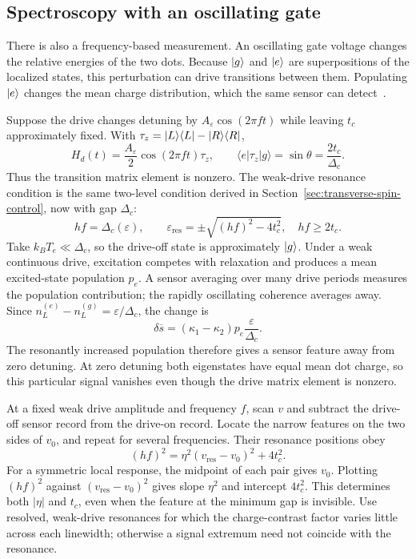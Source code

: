 \subsection{Spectroscopy with an oscillating gate}
\label{sec:measurement-charge-drive-spectroscopy}
There is also a frequency-based measurement. An oscillating gate
voltage changes the relative energies of the two dots. Because
$\lvert g\rangle$ and $\lvert e\rangle$ are superpositions of the localized states,
this perturbation can drive transitions between them. Populating
$\lvert e\rangle$ changes the mean charge distribution, which the same
sensor can detect~\cite{Petta2004Charge}.

Suppose the drive changes detuning by
$A_\varepsilon\cos(2\pi ft)$ while leaving $t_c$ approximately
fixed. With $\tau_z=\lvert L\rangle\langle L\rvert-\lvert R\rangle\langle R\rvert$,
\begin{equation}
 H_d(t)=\frac{A_\varepsilon}{2}\cos(2\pi ft)\tau_z,
 \qquad
 \langle e|\tau_z|g\rangle=\sin\theta=\frac{2t_c}{\Delta_c}.
 \label{eq:measurement-charge-drive}
\end{equation}
Thus the transition matrix element is nonzero. The weak-drive
resonance condition is the same two-level condition derived in
Section~\ref{sec:transverse-spin-control}, now with gap $\Delta_c$:
\begin{equation}
 hf=\Delta_c(\varepsilon),\qquad
 \varepsilon_{\mathrm{res}}
      =\pm\sqrt{(hf)^2-4t_c^2},\quad hf\geq2t_c.
 \label{eq:measurement-photon-assisted-tunneling}
\end{equation}
Take $k_BT_e\ll\Delta_c$, so the drive-off state is approximately
$\lvert g\rangle$. Under a weak continuous drive, excitation competes with
relaxation and produces a mean excited-state population $p_e$.
A sensor averaging over many drive periods measures the population
contribution; the rapidly oscillating coherence averages away.
Since $n_L^{(e)}-n_L^{(g)}=\varepsilon/\Delta_c$, the change is
\begin{equation}
 \delta\overline s=(\kappa_1-\kappa_2)p_e
                         \frac{\varepsilon}{\Delta_c}.
 \label{eq:measurement-charge-resonance-signal}
\end{equation}
The resonantly increased population therefore gives a sensor
feature away from zero detuning. At zero detuning both eigenstates
have equal mean dot charge, so this particular signal vanishes
even though the drive matrix element is nonzero.

At a fixed weak drive amplitude and frequency $f$, scan $v$ and
subtract the drive-off sensor record from the drive-on record.
Locate the narrow features on the two sides of $v_0$, and repeat
for several frequencies. Their resonance positions obey
\begin{equation}
 (hf)^2=\eta^2(v_{\mathrm{res}}-v_0)^2+4t_c^2.
 \label{eq:measurement-charge-resonance-fit}
\end{equation}
For a symmetric local response, the midpoint of each pair gives
$v_0$. Plotting $(hf)^2$ against $(v_{\mathrm{res}}-v_0)^2$
gives slope $\eta^2$ and intercept $4t_c^2$. This determines both
$|\eta|$ and $t_c$, even when the feature at the minimum gap is
invisible. Use resolved, weak-drive resonances for which the
charge-contrast factor varies little across each linewidth;
otherwise a signal extremum need not coincide with the resonance.
